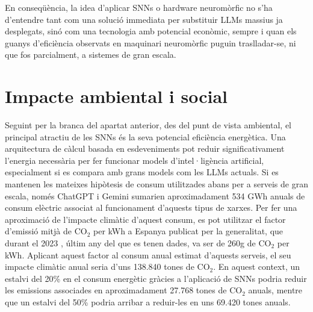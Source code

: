 \documentclass[a4paper,11pt, titlepage, twoside]{article}
\begin{document}
En conseqüència, la idea d'aplicar SNNs o hardware neuromòrfic no s'ha d'entendre tant com una solució immediata per substituir LLMs massius ja desplegats, sinó com una tecnologia amb potencial econòmic, sempre i quan els guanys d'eficiència observats en maquinari neuromòrfic puguin traslladar-se, ni que fos parcialment, a sistemes de gran escala.

\section{Impacte ambiental i social}

Seguint per la branca del apartat anterior, des del punt de vista ambiental, el principal atractiu de les SNNs és la seva potencial eficiència energètica. Una arquitectura de càlcul basada en esdeveniments pot reduir significativament l’energia necessària per fer funcionar models d'intel·ligència artificial, especialment si es compara amb grans models com les LLMs actuals. Si es mantenen les mateixes hipòtesis de consum utilitzades abans per a serveis de gran escala, només ChatGPT i Gemini sumarien aproximadament 534 GWh anuals de consum elèctric associat al funcionament d'aquests tipus de xarxes. Per fer una aproximació de l'impacte climàtic d'aquest consum, es pot utilitzar el factor d'emissió mitjà de CO$_2$ per kWh a Espanya publicat per la generalitat, que durant el 2023 \cite{gencat_mix_electric_co2}, últim any del que es tenen dades, va ser de 260g de CO$_2$ per kWh. Aplicant aquest factor al consum anual estimat d'aquests serveis, el seu impacte climàtic anual seria d'uns 138.840 tones de CO$_2$. En aquest context, un estalvi del 20\% en el consum energètic gràcies a l'aplicació de SNNs podria reduir les emissions associades en aproximadament 27.768 tones de CO$_2$ anuals, mentre que un estalvi del 50\% podria arribar a reduir-les en uns 69.420 tones anuals.
\end{document}
